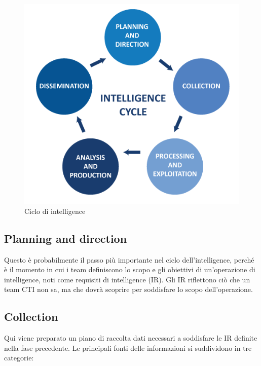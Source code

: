 \begin{figure}[h]
\begin{center}
\includegraphics[width=0.80\columnwidth]{images/3_CTI_img/processoDiIntelligence.png}
\end{center}
\caption{Ciclo di intelligence}
\label{fig:Ciclo di intelligence}
\end{figure}



\subsection{Planning and direction}

Questo è probabilmente il passo più importante nel ciclo dell'intelligence, perché è il momento in cui i team definiscono lo scopo e gli obiettivi di un'operazione di intelligence, noti come requisiti di intelligence (IR).
Gli IR riflettono ciò che un team CTI non sa, ma che dovrà scoprire per soddisfare lo scopo dell'operazione.

\newpage

\subsection{Collection}

Qui viene preparato un piano di raccolta dati necessari a soddisfare le IR definite nella fase precedente.
Le principali fonti delle informazioni si suddividono in tre categorie:

